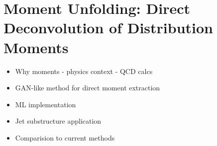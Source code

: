 \chapter{Moment Unfolding: Direct Deconvolution of Distribution Moments}
\label{chap:moment_unfolding}
\begin{itemize}
    \item Why moments - physics context - QCD calcs
    \item GAN-like method for direct moment extraction
    \item ML implementation
    \item Jet substructure application
    \item Comparision to current methods
\end{itemize}